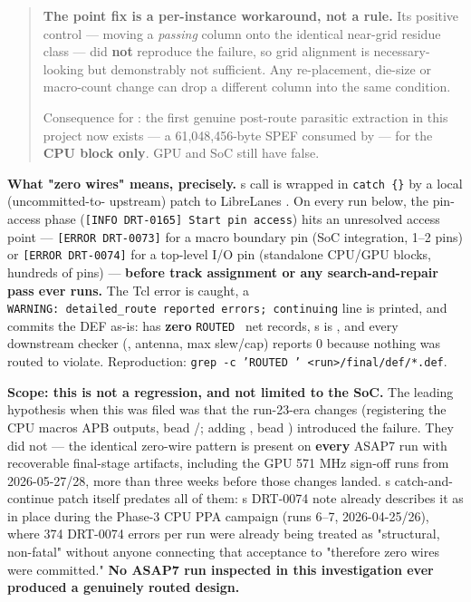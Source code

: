 \begin{record}
\begin{quote}
\warn{} \textbf{The point fix is a per-instance workaround, not a rule.}
Its positive control --- moving a \emph{passing} column onto the
identical near-grid residue class --- did \textbf{not} reproduce the
failure, so grid alignment is necessary-looking but demonstrably not
sufficient. Any re-placement, die-size or macro-count change can drop a
different column into the same condition.

Consequence for : the first genuine post-route parasitic
extraction in this project now exists --- a 61,048,456-byte SPEF
consumed by  --- for the \textbf{CPU block
only}. GPU and SoC still have  false.
\end{quote}

\textbf{What "zero wires" means, precisely.}
\textquotesingle s 
call is wrapped in \texttt{catch\ \{\}} by a local (uncommitted-to-
upstream) patch to LibreLane\textquotesingle s
. On every run below, the
pin-access phase
(\texttt{[INFO\ DRT-\allowbreak{}0165]\ Start\ pin\ access}) hits an
unresolved access point --- \texttt{[ERROR\ DRT-\allowbreak{}0073]} for
a macro boundary pin (SoC integration, 1--2 pins) or
\texttt{[ERROR\ DRT-\allowbreak{}0074]} for a top-level I/O pin
(standalone CPU/GPU blocks, hundreds of pins) --- \textbf{before track
assignment or any search-and-repair pass ever runs.} The Tcl error is
caught, a
\texttt{WARNING:\allowbreak{}\ detailed\_\allowbreak{}route\ reported\ errors;\ continuing}
line is printed, and  commits the DEF as-is:
 has \textbf{zero} \texttt{ROUTED\ } net records,
\textquotesingle s
 is , and every downstream checker
(, antenna, max slew/cap) reports 0 because
nothing was routed to violate. Reproduction:
\texttt{grep\ -\allowbreak{}c\ 'ROUTED\ '\ <run>/\allowbreak{}final/\allowbreak{}def/\allowbreak{}*.\allowbreak{}def}.

\textbf{Scope: this is not a regression, and not limited to the SoC.}
The leading hypothesis when this was filed was that the run-23-era
changes (registering the CPU macro\textquotesingle s APB outputs, bead
/; adding , bead )
introduced the failure. They did not --- the identical zero-wire pattern
is present on \textbf{every} ASAP7 run with recoverable final-stage
artifacts, including the GPU 571 MHz sign-off runs from
2026-05-27/\allowbreak{}28, more than three weeks before those changes
landed. \textquotesingle s catch-and-continue patch itself
predates all of them: \textquotesingle s
DRT-0074 note already describes it as in place during the Phase-3 CPU
PPA campaign (runs 6--7, 2026-04-25/\allowbreak{}26), where 374 DRT-0074
errors per run were already being treated as "structural, non-fatal"
without anyone connecting that acceptance to "therefore zero wires were
committed." \textbf{No ASAP7 run inspected in this investigation ever
produced a genuinely routed design.}


\end{record}
